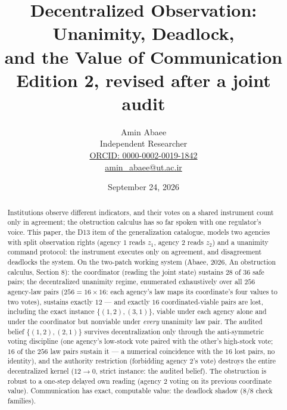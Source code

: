 \documentclass[10pt,twocolumn]{article}
\theoremstyle{definition}
\begin{document}
\title{Decentralized Observation: Unanimity, Deadlock,\\ and the Value of Communication\\[0.2em]
{\large\rmfamily Edition 2, revised after a joint audit}}
\author{Amin Abaee\\[0.35em]
{\small Independent Researcher}\\[0.55em]
{\small\href{https://orcid.org/0000-0002-0019-1842}{ORCID: 0000-0002-0019-1842}}\\[0.3em]
{\small\href{mailto:amin\_abaee@ut.ac.ir}{amin\_abaee@ut.ac.ir}}}
\date{September 24, 2026}
\maketitle

\begin{abstract}
Institutions observe different indicators, and their votes on a shared
instrument count only in agreement; the obstruction calculus has so far
spoken with one regulator's voice. This paper, the D13 item of the
generalization catalogue, models two agencies with split observation
rights (agency $1$ reads $z_1$, agency $2$ reads $z_2$) and a unanimity
command protocol: the instrument executes only on agreement, and
disagreement deadlocks the system. On the two-patch working system
(Abaee, 2026, An obstruction calculus, Section 8): the coordinator (reading the joint state)
sustains $28$ of $36$ safe pairs; the decentralized unanimity regime,
enumerated exhaustively over all $256$ agency-law pairs
($256=16\times16$: each agency's law maps its coordinate's four values to
two votes), sustains exactly $12$ --- and exactly $16$ coordinated-viable
pairs are lost, including the exact instance $\{(1,2),(3,1)\}$, viable
under each agency alone and under the coordinator but nonviable under
\emph{every} unanimity law pair. The audited belief $\{(1,2),(2,1)\}$
survives decentralization only through the anti-symmetric voting
discipline (one agency's low-stock vote paired with the other's
high-stock vote; $16$ of the $256$ law pairs sustain it --- a numerical
coincidence with the $16$ lost pairs, no identity), and the authority
restriction (forbidding agency 2's vote) destroys the entire decentralized
kernel ($12\to0$, strict instance: the audited belief). The obstruction
is robust to a one-step delayed own reading (agency 2 voting on its
previous coordinate value). Communication has exact, computable value:
the deadlock shadow (8/8 check families).
\end{abstract}
\end{document}
